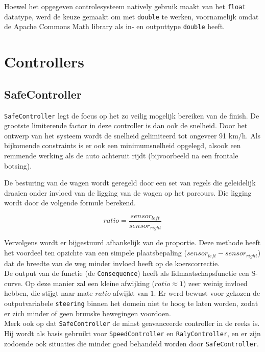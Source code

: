 \documentclass[10pt,a4paper]{article}
\begin{document}
		Hoewel het opgegeven controlesysteem natively gebruik maakt van het \texttt{float} datatype, werd de keuze gemaakt om met \texttt{double} te werken, voornamelijk omdat de Apache Commons Math library als in- en outputtype \texttt{double} heeft.

	\section{Controllers}
		\subsection{SafeController}
			\texttt{SafeController} legt de focus op het zo veilig mogelijk bereiken van de finish. De grootste limiterende factor in deze controller is dan ook de snelheid. Door het ontwerp van het systeem wordt de snelheid gelimiteerd tot ongeveer 91 km/h. Als bijkomende constraints is er ook een minimumsnelheid opgelegd, alsook een remmende werking als de auto achteruit rijdt (bijvoorbeeld na een frontale botsing).

			De besturing van de wagen wordt geregeld door een set van regels die geleidelijk draaien onder invloed van de ligging van de wagen op het parcours. Die ligging wordt door de volgende formule berekend.

			\begin{equation}
	ratio = \frac{sensor_{left}}{sensor_{right}}
			\end{equation}

			Vervolgens wordt er bijgestuurd afhankelijk van de proportie. Deze methode heeft het voordeel ten opzichte van een simpele plaatsbepaling ($sensor_{left} - sensor_{right}$) dat de breedte van de weg minder invloed heeft op de koerscorrectie.\\
			De output van de functie (de \texttt{Consequence}) heeft als lidmaatschapsfunctie een S-curve. Op deze manier zal een kleine afwijking ($ratio \approx 1$) zeer weinig invloed hebben, die stijgt naar mate $ratio$ afwijkt van $1$. Er werd bewust voor gekozen de outputvariabele \texttt{steering} binnen het domein niet te hoog te laten worden, zodat er zich minder of geen bruuske bewegingen voordoen.\\

			Merk ook op dat \texttt{SafeController} de minst geavanceerde controller in de reeks is. Hij wordt als basis gebruikt voor \texttt{SpeedController} en \texttt{RalyController}, en er zijn zodoende ook situaties die minder goed behandeld worden door \texttt{SafeController}.\\
\end{document}
